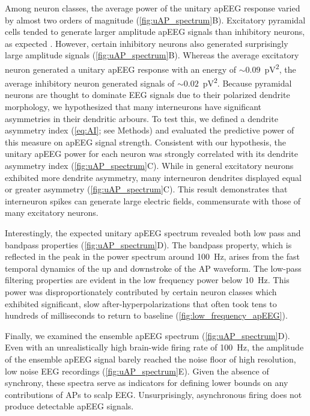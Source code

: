 Among neuron classes, the average power of the unitary apEEG response varied by almost two orders of magnitude ({\autoref{fig:uAP_spectrum}B}). Excitatory pyramidal cells tended to generate larger amplitude apEEG signals than inhibitory neurons, as expected \cite{Thio2023}. However, certain inhibitory neurons also generated surprisingly large amplitude signals ({\autoref{fig:uAP_spectrum}B}). Whereas the average excitatory neuron generated a unitary apEEG response with an energy of ${\sim}0.09$~\unit{\pico\volt^2}, the average inhibitory neuron generated signals of ${\sim}0.02$~\unit{\pico\volt^2}. Because pyramidal neurons are thought to dominate EEG signals due to their polarized dendrite morphology, we hypothesized that many interneurons have significant asymmetries in their dendritic arbours. To test this, we defined a dendrite asymmetry index ({\ref{eq:AI}}; see Methods) and evaluated the predictive power of this measure on apEEG signal strength. Consistent with our hypothesis, the unitary apEEG power for each neuron was strongly correlated with its dendrite asymmetry index ({\autoref{fig:uAP_spectrum}C}). While in general excitatory neurons exhibited more dendrite asymmetry, many interneuron dendrites displayed equal or greater asymmetry ({\autoref{fig:uAP_spectrum}C}). This result demonstrates that interneuron spikes can generate large electric fields, commensurate with those of many excitatory neurons. 

Interestingly, the expected unitary apEEG spectrum revealed both low pass and bandpass properties ({\autoref{fig:uAP_spectrum}D}). The bandpass property, which is reflected in the peak in the power spectrum around 100~\unit{\hertz}, arises from the fast temporal dynamics of the up and downstroke of the AP waveform. The low-pass filtering properties are evident in the low frequency power below 10~\unit{\hertz}. This power was disproportionately contributed by certain neuron classes which exhibited significant, slow after-hyperpolarizations that often took tens to hundreds of milliseconds to return to baseline ({\autoref{fig:low_frequency_apEEG}}). 

Finally, we examined the ensemble apEEG spectrum ({\autoref{fig:uAP_spectrum}D}). Even with an unrealistically high brain-wide firing rate of 100~\unit{\hertz}, the amplitude of the ensemble apEEG signal barely reached the noise floor of high resolution, low noise EEG recordings ({\autoref{fig:uAP_spectrum}E}). Given the absence of synchrony, these spectra serve as indicators for defining lower bounds on any contributions of APs to scalp EEG. Unsurprisingly, asynchronous firing does not produce detectable apEEG signals.

